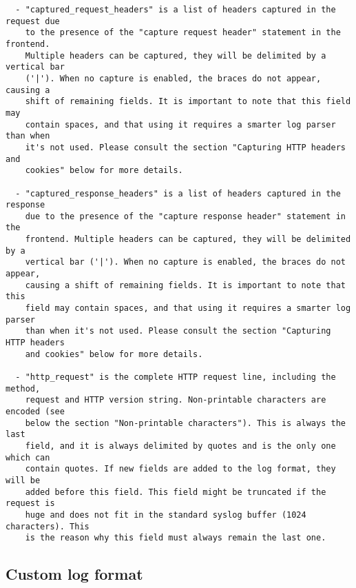 \begin{verbatim}
  - "captured_request_headers" is a list of headers captured in the request due
    to the presence of the "capture request header" statement in the frontend.
    Multiple headers can be captured, they will be delimited by a vertical bar
    ('|'). When no capture is enabled, the braces do not appear, causing a
    shift of remaining fields. It is important to note that this field may
    contain spaces, and that using it requires a smarter log parser than when
    it's not used. Please consult the section "Capturing HTTP headers and
    cookies" below for more details.

  - "captured_response_headers" is a list of headers captured in the response
    due to the presence of the "capture response header" statement in the
    frontend. Multiple headers can be captured, they will be delimited by a
    vertical bar ('|'). When no capture is enabled, the braces do not appear,
    causing a shift of remaining fields. It is important to note that this
    field may contain spaces, and that using it requires a smarter log parser
    than when it's not used. Please consult the section "Capturing HTTP headers
    and cookies" below for more details.

  - "http_request" is the complete HTTP request line, including the method,
    request and HTTP version string. Non-printable characters are encoded (see
    below the section "Non-printable characters"). This is always the last
    field, and it is always delimited by quotes and is the only one which can
    contain quotes. If new fields are added to the log format, they will be
    added before this field. This field might be truncated if the request is
    huge and does not fit in the standard syslog buffer (1024 characters). This
    is the reason why this field must always remain the last one.
\end{verbatim}

\subsection{Custom log format}

